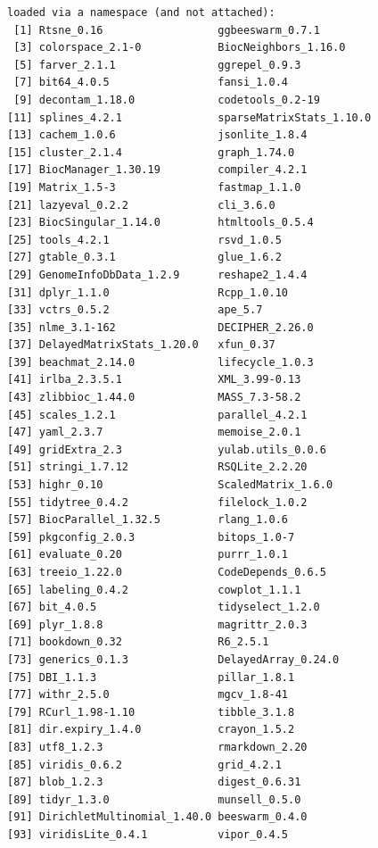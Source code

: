 \documentclass[
]{book}
\begin{document}
\begin{verbatim}
loaded via a namespace (and not attached):
 [1] Rtsne_0.16                  ggbeeswarm_0.7.1           
 [3] colorspace_2.1-0            BiocNeighbors_1.16.0       
 [5] farver_2.1.1                ggrepel_0.9.3              
 [7] bit64_4.0.5                 fansi_1.0.4                
 [9] decontam_1.18.0             codetools_0.2-19           
[11] splines_4.2.1               sparseMatrixStats_1.10.0   
[13] cachem_1.0.6                jsonlite_1.8.4             
[15] cluster_2.1.4               graph_1.74.0               
[17] BiocManager_1.30.19         compiler_4.2.1             
[19] Matrix_1.5-3                fastmap_1.1.0              
[21] lazyeval_0.2.2              cli_3.6.0                  
[23] BiocSingular_1.14.0         htmltools_0.5.4            
[25] tools_4.2.1                 rsvd_1.0.5                 
[27] gtable_0.3.1                glue_1.6.2                 
[29] GenomeInfoDbData_1.2.9      reshape2_1.4.4             
[31] dplyr_1.1.0                 Rcpp_1.0.10                
[33] vctrs_0.5.2                 ape_5.7                    
[35] nlme_3.1-162                DECIPHER_2.26.0            
[37] DelayedMatrixStats_1.20.0   xfun_0.37                  
[39] beachmat_2.14.0             lifecycle_1.0.3            
[41] irlba_2.3.5.1               XML_3.99-0.13              
[43] zlibbioc_1.44.0             MASS_7.3-58.2              
[45] scales_1.2.1                parallel_4.2.1             
[47] yaml_2.3.7                  memoise_2.0.1              
[49] gridExtra_2.3               yulab.utils_0.0.6          
[51] stringi_1.7.12              RSQLite_2.2.20             
[53] highr_0.10                  ScaledMatrix_1.6.0         
[55] tidytree_0.4.2              filelock_1.0.2             
[57] BiocParallel_1.32.5         rlang_1.0.6                
[59] pkgconfig_2.0.3             bitops_1.0-7               
[61] evaluate_0.20               purrr_1.0.1                
[63] treeio_1.22.0               CodeDepends_0.6.5          
[65] labeling_0.4.2              cowplot_1.1.1              
[67] bit_4.0.5                   tidyselect_1.2.0           
[69] plyr_1.8.8                  magrittr_2.0.3             
[71] bookdown_0.32               R6_2.5.1                   
[73] generics_0.1.3              DelayedArray_0.24.0        
[75] DBI_1.1.3                   pillar_1.8.1               
[77] withr_2.5.0                 mgcv_1.8-41                
[79] RCurl_1.98-1.10             tibble_3.1.8               
[81] dir.expiry_1.4.0            crayon_1.5.2               
[83] utf8_1.2.3                  rmarkdown_2.20             
[85] viridis_0.6.2               grid_4.2.1                 
[87] blob_1.2.3                  digest_0.6.31              
[89] tidyr_1.3.0                 munsell_0.5.0              
[91] DirichletMultinomial_1.40.0 beeswarm_0.4.0             
[93] viridisLite_0.4.1           vipor_0.4.5                
\end{verbatim}
\end{document}
